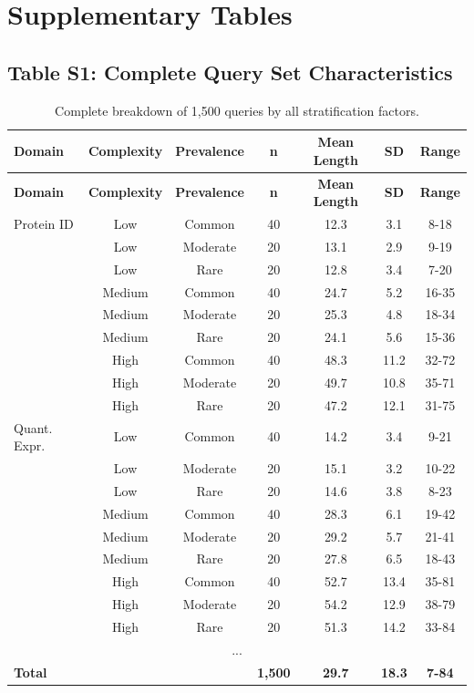 \documentclass[11pt,a4paper]{article}
\begin{document}
\section{Supplementary Tables}

\subsection{Table S1: Complete Query Set Characteristics}

\begin{longtable}{lcccccc}
\caption{Complete breakdown of 1,500 queries by all stratification factors.} \label{tab:query-breakdown} \\
\toprule
\textbf{Domain} & \textbf{Complexity} & \textbf{Prevalence} & \textbf{n} & \textbf{Mean Length} & \textbf{SD} & \textbf{Range} \\
\midrule
\endfirsthead
\toprule
\textbf{Domain} & \textbf{Complexity} & \textbf{Prevalence} & \textbf{n} & \textbf{Mean Length} & \textbf{SD} & \textbf{Range} \\
\midrule
\endhead
\bottomrule
\endfoot

Protein ID & Low & Common & 40 & 12.3 & 3.1 & 8-18 \\
 & Low & Moderate & 20 & 13.1 & 2.9 & 9-19 \\
 & Low & Rare & 20 & 12.8 & 3.4 & 7-20 \\
 & Medium & Common & 40 & 24.7 & 5.2 & 16-35 \\
 & Medium & Moderate & 20 & 25.3 & 4.8 & 18-34 \\
 & Medium & Rare & 20 & 24.1 & 5.6 & 15-36 \\
 & High & Common & 40 & 48.3 & 11.2 & 32-72 \\
 & High & Moderate & 20 & 49.7 & 10.8 & 35-71 \\
 & High & Rare & 20 & 47.2 & 12.1 & 31-75 \\
\midrule

Quant. Expr. & Low & Common & 40 & 14.2 & 3.4 & 9-21 \\
 & Low & Moderate & 20 & 15.1 & 3.2 & 10-22 \\
 & Low & Rare & 20 & 14.6 & 3.8 & 8-23 \\
 & Medium & Common & 40 & 28.3 & 6.1 & 19-42 \\
 & Medium & Moderate & 20 & 29.2 & 5.7 & 21-41 \\
 & Medium & Rare & 20 & 27.8 & 6.5 & 18-43 \\
 & High & Common & 40 & 52.7 & 13.4 & 35-81 \\
 & High & Moderate & 20 & 54.2 & 12.9 & 38-79 \\
 & High & Rare & 20 & 51.3 & 14.2 & 33-84 \\
\midrule
\multicolumn{7}{c}{...} \\
\midrule
\textbf{Total} &  &  & \textbf{1,500} & \textbf{29.7} & \textbf{18.3} & \textbf{7-84} \\
\end{longtable}
\end{document}
